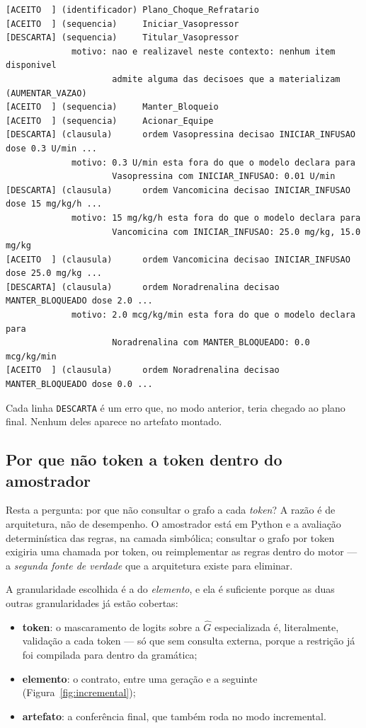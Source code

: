 \documentclass[11pt,a4paper]{article}
\begin{document}
\begin{lstlisting}[caption={Trilha de montagem: sete propostas descartadas, duas cláusulas aceitas.}]
[ACEITO  ] (identificador) Plano_Choque_Refratario
[ACEITO  ] (sequencia)     Iniciar_Vasopressor
[DESCARTA] (sequencia)     Titular_Vasopressor
             motivo: nao e realizavel neste contexto: nenhum item disponivel
                     admite alguma das decisoes que a materializam (AUMENTAR_VAZAO)
[ACEITO  ] (sequencia)     Manter_Bloqueio
[ACEITO  ] (sequencia)     Acionar_Equipe
[DESCARTA] (clausula)      ordem Vasopressina decisao INICIAR_INFUSAO dose 0.3 U/min ...
             motivo: 0.3 U/min esta fora do que o modelo declara para
                     Vasopressina com INICIAR_INFUSAO: 0.01 U/min
[DESCARTA] (clausula)      ordem Vancomicina decisao INICIAR_INFUSAO dose 15 mg/kg/h ...
             motivo: 15 mg/kg/h esta fora do que o modelo declara para
                     Vancomicina com INICIAR_INFUSAO: 25.0 mg/kg, 15.0 mg/kg
[ACEITO  ] (clausula)      ordem Vancomicina decisao INICIAR_INFUSAO dose 25.0 mg/kg ...
[DESCARTA] (clausula)      ordem Noradrenalina decisao MANTER_BLOQUEADO dose 2.0 ...
             motivo: 2.0 mcg/kg/min esta fora do que o modelo declara para
                     Noradrenalina com MANTER_BLOQUEADO: 0.0 mcg/kg/min
[ACEITO  ] (clausula)      ordem Noradrenalina decisao MANTER_BLOQUEADO dose 0.0 ...
\end{lstlisting}

Cada linha \texttt{DESCARTA} é um erro que, no modo anterior, teria chegado ao
plano final. Nenhum deles aparece no artefato montado.

\subsection{Por que não token a token dentro do amostrador}

Resta a pergunta: por que não consultar o grafo a cada \emph{token}? A razão é
de arquitetura, não de desempenho. O amostrador está em Python e a avaliação
determinística das regras, na camada simbólica; consultar o grafo por token
exigiria uma chamada por token, ou reimplementar as regras dentro do motor ---
a \emph{segunda fonte de verdade} que a arquitetura existe para eliminar.

A granularidade escolhida é a do \emph{elemento}, e ela é suficiente porque as
duas outras granularidades já estão cobertas:

\begin{itemize}[leftmargin=*,itemsep=1pt]
\item \textbf{token}: o mascaramento de logits sobre a $\hat{G}$ especializada é,
literalmente, validação a cada token --- só que sem consulta externa, porque a
restrição já foi compilada para dentro da gramática;
\item \textbf{elemento}: o contrato, entre uma geração e a seguinte
(Figura~\ref{fig:incremental});
\item \textbf{artefato}: a conferência final, que também roda no modo
incremental.
\end{itemize}
\end{document}

